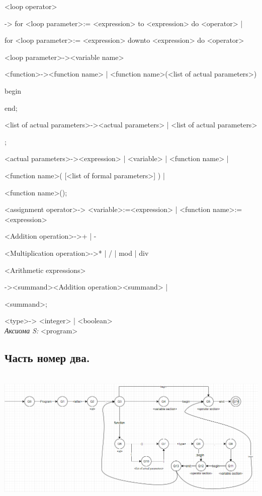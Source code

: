 \documentclass[12pt]{article}
\begin{document}
<loop operator> 

\qquad-> for <loop parameter>:= <expression> to <expression> do <operator>  | 

\qquad      for <loop parameter>:= <expression> downto <expression> do <operator>

<loop parameter>-><variable name>


<function>-><function name> | <function name>(<list of actual parameters>)

\qquad    begin

 \qquad{}

 \qquad   end;

<list of actual parameters>-><actual parameters>  | <list of actual parameters>

\qquad\qquad\qquad\qquad\qquad\qquad\qquad\qquad{};

<actual parameters>-><expression>  | <variable>  | <function name>  |  

\qquad\qquad\qquad\qquad\qquad\qquad\qquad\qquad{}


<function name>( [<list of formal parameters>] )  | 

<function name>();


<assignment operator>-> <variable>:=<expression> | <function name>:=<expression> 


<Addition operation>->+  | - 

<Multiplication operation>->*  | /  | mod  | div 


<Arithmetic expressions> 

\qquad  -><summand><Addition operation><summand> | 

      \qquad{} <summand>;


<type>-> <integer>  | <boolean> \\

\textit{\large{Аксиома S:}}  <program>  \\


\begin{center}
    \chapter{\textbf{\Large{Часть номер два.}}}    
\end{center} \\
\includegraphics[width=1\textwidth]{assets/ДКА.png}
\end{document}
